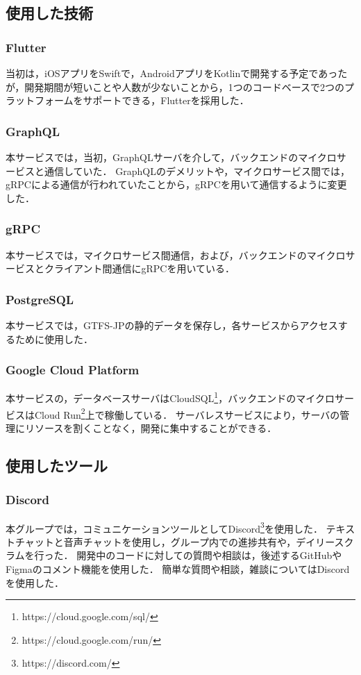 \subsection{使用した技術}
\subsubsection{Flutter}
当初は，iOSアプリをSwiftで，AndroidアプリをKotlinで開発する予定であったが，開発期間が短いことや人数が少ないことから，1つのコードベースで2つのプラットフォームをサポートできる，Flutterを採用した．

\subsubsection{GraphQL}
本サービスでは，当初，GraphQLサーバを介して，バックエンドのマイクロサービスと通信していた．
GraphQLのデメリットや，マイクロサービス間では，gRPCによる通信が行われていたことから，gRPCを用いて通信するように変更した．

\subsubsection{gRPC}
本サービスでは，マイクロサービス間通信，および，バックエンドのマイクロサービスとクライアント間通信にgRPCを用いている．

\subsubsection{PostgreSQL}
本サービスでは，GTFS-JPの静的データを保存し，各サービスからアクセスするために使用した．

\subsubsection{Google Cloud Platform}
本サービスの，データベースサーバはCloudSQL\footnote{https://cloud.google.com/sql/}，バックエンドのマイクロサービスはCloud Run\footnote{https://cloud.google.com/run/}上で稼働している．
サーバレスサービスにより，サーバの管理にリソースを割くことなく，開発に集中することができる．

\subsection{使用したツール}
\subsubsection{Discord}
本グループでは，コミュニケーションツールとしてDiscord\footnote{https://discord.com/}を使用した．
テキストチャットと音声チャットを使用し，グループ内での進捗共有や，デイリースクラムを行った．
開発中のコードに対しての質問や相談は，後述するGitHubやFigmaのコメント機能を使用した．
簡単な質問や相談，雑談についてはDiscordを使用した．

